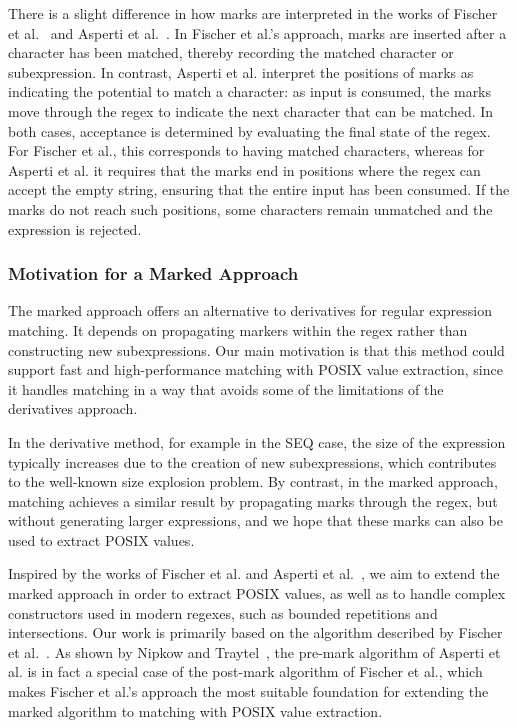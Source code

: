 \documentclass[12pt]{article}
\begin{document}
There is a slight difference in how marks are interpreted in the works of Fischer et al.~\cite{Fischer2010} 
and Asperti et al.~\cite{Asperti2010}. 
In Fischer et al.’s approach, marks are inserted after a character has been matched, thereby recording the matched character or subexpression. 
In contrast, Asperti et al. interpret the positions of marks as indicating the potential to match a character: as input is consumed, 
the marks move through the regex to indicate the next character that can be matched. 
In both cases, acceptance is determined by evaluating the final state of the regex. 
For Fischer et al., this corresponds to having matched characters, whereas for Asperti et al. it requires that the marks end in positions 
where the regex can accept the empty string, ensuring that the entire input has been consumed. 
If the marks do not reach such positions, some characters remain unmatched and the expression is rejected.

\subsubsection{Motivation for a Marked Approach}

The marked approach offers an alternative to derivatives for regular expression matching. 
It depends on propagating markers within the regex rather than constructing new subexpressions. 
Our main motivation is that this method could support fast and high-performance matching with POSIX value extraction, 
since it handles matching in a way that avoids some of the limitations of the derivatives approach.  

In the derivative method, for example in the SEQ case, the size of the expression typically increases due to the creation of new
subexpressions, which contributes to the well-known size explosion problem. 
By contrast, in the marked approach, matching achieves a similar result by propagating marks through the regex, 
but without generating larger expressions, and we hope that these marks can also be used to extract POSIX values.  

Inspired by the works of Fischer et al. and Asperti et al.~\cite{Fischer2010, Asperti2010}, 
we aim to extend the marked approach in order to extract POSIX values, as well as to handle complex constructors used in modern regexes, 
such as bounded repetitions and intersections. 
Our work is primarily based on the algorithm described by Fischer et al.~\cite{Fischer2010}. 
As shown by Nipkow and Traytel~\cite{NipkowTraytel2014}, the pre-mark algorithm of Asperti et al. is in fact a special case of the 
post-mark algorithm of Fischer et al., which makes Fischer et al.’s approach the most suitable foundation for extending the marked 
algorithm to matching with POSIX value extraction.
\end{document}
